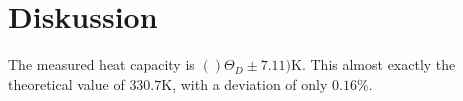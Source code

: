 \section{Diskussion}
\label{sec:Diskussion}
The measured heat capacity is $()\Theta_D \pm 7.11)\text{K}$. This almost exactly the theoretical value of $330.7\text{K}$, with a deviation of only $0.16\%$.